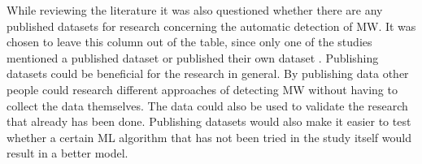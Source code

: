While reviewing the literature it was also questioned whether there are any published datasets for research concerning the automatic detection of MW. It was chosen to leave this column out of the table, since only one of the studies mentioned a published dataset or published their own dataset \cite{Zhao2017ScalableApproach}. Publishing datasets could be beneficial for the research in general. By publishing data other people could research different approaches of detecting MW without having to collect the data themselves. The data could also be used to validate the research that already has been done. Publishing datasets would also make it easier to test whether a certain ML algorithm that has not been tried in the study itself would result in a better model.